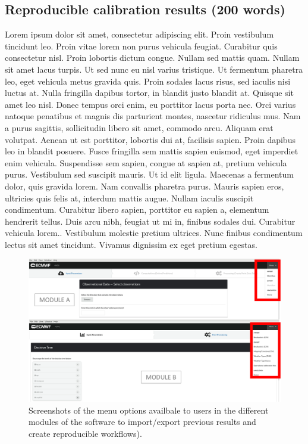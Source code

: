 \documentclass[techmemo]{ecmwfrep}%
\begin{document}
\subsection{Reproducible calibration results (200 words)}
Lorem ipsum dolor sit amet, consectetur adipiscing elit. Proin vestibulum tincidunt leo. Proin vitae lorem non purus vehicula feugiat. Curabitur quis consectetur nisl. Proin lobortis dictum congue. Nullam sed mattis quam. Nullam sit amet lacus turpis. Ut sed nunc eu nisl varius tristique. Ut fermentum pharetra leo, eget vehicula metus gravida quis. Proin sodales lacus risus, sed iaculis nisi luctus at. Nulla fringilla dapibus tortor, in blandit justo blandit at. Quisque sit amet leo nisl. Donec tempus orci enim, eu porttitor lacus porta nec. Orci varius natoque penatibus et magnis dis parturient montes, nascetur ridiculus mus. Nam a purus sagittis, sollicitudin libero sit amet, commodo arcu. Aliquam erat volutpat. Aenean ut est porttitor, lobortis dui at, facilisis sapien. Proin dapibus leo in blandit posuere. Fusce fringilla sem mattis sapien euismod, eget imperdiet enim vehicula. Suspendisse sem sapien, congue at sapien at, pretium vehicula purus. Vestibulum sed suscipit mauris. Ut id elit ligula. Maecenas a fermentum dolor, quis gravida lorem. Nam convallis pharetra purus. Mauris sapien eros, ultricies quis felis at, interdum mattis augue. Nullam iaculis suscipit condimentum. Curabitur libero sapien, porttitor eu sapien a, elementum hendrerit tellus. Duis arcu nibh, feugiat ut mi in, finibus sodales dui. Curabitur vehicula lorem.. Vestibulum molestie pretium ultrices. Nunc finibus condimentum lectus sit amet tincidunt. Vivamus dignissim ex eget pretium egestas.

\begin{figure}
\includegraphics{Figures/Reproducible_Results.png}
\caption{Screenshots of the menu options availbale to users in the different modules of the software to import/export previous results and create reproducible workflows).}
\label{Reproducible_Results}
\end{figure}
\end{document}
